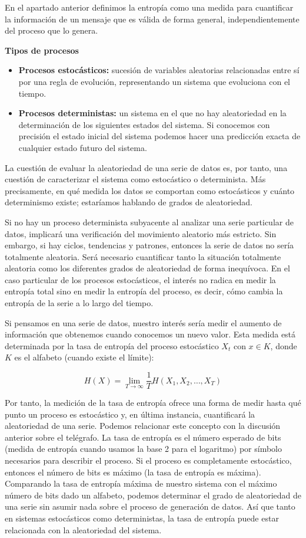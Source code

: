\documentclass[a4paper,12pt]{article}
\begin{document}
En el apartado anterior definimos la entropía como una medida para cuantificar la información de un mensaje que es válida de forma general, independientemente del proceso que lo genera.

\textbf{Tipos de procesos}
\begin{itemize}[noitemsep, topsep=2pt]
	\item \textbf{Procesos estocásticos:} sucesión de variables aleatorias relacionadas entre sí por una regla de evolución, representando un sistema que evoluciona con el tiempo. 
	\item \textbf{Procesos deterministas:} un sistema en el que no hay aleatoriedad en la determinación de los siguientes estados del sistema. Si conocemos con precisión el estado inicial del sistema podemos hacer una predicción exacta de cualquier estado futuro del sistema.
\end{itemize}

La cuestión de evaluar la aleatoriedad de una serie de datos es, por tanto, una cuestión de caracterizar el sistema como estocástico o determinista. Más precisamente, en qué medida los datos se comportan como estocásticos y cuánto determinismo existe; estaríamos hablando de grados de aleatoriedad. 

Si no hay un proceso determinista subyacente al analizar una serie particular de datos, implicará una verificación del movimiento aleatorio más estricto. Sin embargo, si hay ciclos, tendencias y patrones, entonces la serie de datos no sería totalmente aleatoria. Será necesario cuantificar tanto la situación totalmente aleatoria como los diferentes grados de aleatoriedad de forma inequívoca. En el caso particular de los procesos estocásticos, el interés no radica en medir la entropía total sino en medir la entropía del proceso, es decir, cómo cambia la entropía de la serie a lo largo del tiempo. 

Si pensamos en una serie de datos, nuestro interés sería medir el aumento de información que obtenemos cuando conocemos un nuevo valor. Esta medida está determinada por la tasa de entropía del proceso estocástico $X_t$ con $x \in K$, donde $K$ es el alfabeto (cuando existe el límite):

$$H(X) = \lim_{T\to\infty} \frac{1}{T} H(X_1, X_2, \dots, X_T)$$

Por tanto, la medición de la tasa de entropía ofrece una forma de medir hasta qué punto un proceso es estocástico y, en última instancia, cuantificará la aleatoriedad de una serie. Podemos relacionar este concepto con la discusión anterior sobre el telégrafo. La tasa de entropía es el número esperado de bits (medida de entropía cuando usamos la base 2 para el logaritmo) por símbolo necesarios para describir el proceso. Si el proceso es completamente estocástico, entonces el número de bits es máximo (la tasa de entropía es máxima). Comparando la tasa de entropía máxima de nuestro sistema con el máximo número de bits dado un alfabeto, podemos determinar el grado de aleatoriedad de una serie sin asumir nada sobre el proceso de generación de datos. Así que tanto en sistemas estocásticos como deterministas, la tasa de entropía puede estar relacionada con la aleatoriedad del sistema.
\end{document}
